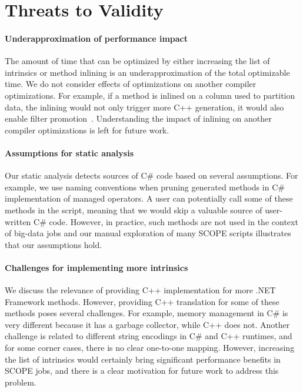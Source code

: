 \section{Threats to Validity}

\paragraph{Underapproximation of performance impact}
The amount of time that can be optimized by either increasing the list of intrinsics or method inlining is an underapproximation of the total optimizable time.
We do not consider effects of optimizations on another compiler optimizations.
For example, if a method is inlined on a column used to partition data, the inlining would not only trigger more C++ generation, it would also enable filter promotion~\cite{}.
Understanding the impact of inlining on another compiler optimizations is left for future work.

\paragraph{Assumptions for static analysis}
Our static analysis detects sources of C\# code based on several assumptions.
For example, we use naming conventions when pruning generated methods in C\# implementation of managed operators.
A user can potentially call some of these methods in the script, meaning that we would skip a valuable source of user-written C\# code.
However, in practice, such methods are not used in the context of big-data jobs and our manual exploration of many SCOPE scripts illustrates that our assumptions hold.

\paragraph{Challenges for implementing more intrinsics}
We discuss the relevance of providing C++ implementation for more .NET Framework methods.
However, providing C++ translation for some of these methods poses several challenges.
For example, memory management in C\# is very different because it has a garbage collector, while C++ does not.
Another challenge is related to different string encodings in C\# and C++ runtimes, and for some corner cases, there is no clear one-to-one mapping.
However, increasing the list of intrinsics would certainly bring significant performance benefits in SCOPE jobs, and there is a clear motivation for future work to address this problem.  
